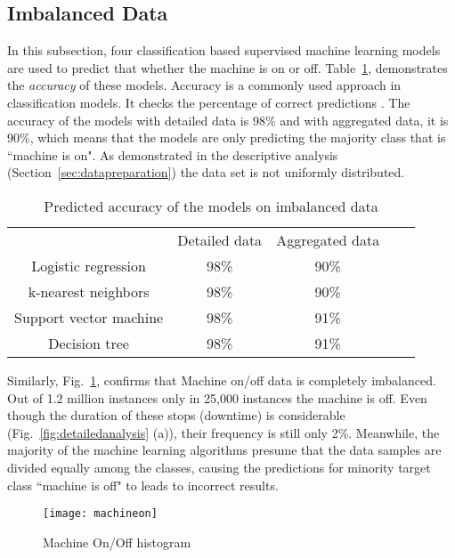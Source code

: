 \documentclass[runningheads]{llncs}
\begin{document}
\subsection {Imbalanced Data}
\label{sec:imbalanced}
In this subsection, four classification based supervised machine learning models are used to predict that whether the machine is on or off. Table~\ref{example3}, demonstrates the \emph{accuracy} of these models. Accuracy is a commonly used approach in classification models. It checks the percentage of correct predictions \cite{book}. The accuracy of the models with detailed data is 98\% and with aggregated data, it is 90\%, which means that the models are only predicting the majority class that is ``machine is on". As demonstrated in the descriptive analysis (Section~\ref{sec:datapreparation}) the data set is not uniformly distributed. 

\begin{table}[ht]
\caption{Predicted accuracy of the models on imbalanced data}
\label{example3}
\centering
\begin{tabular}{ccccc}
\hline\noalign{\smallskip}
 & Detailed data & Aggregated data \\

\noalign{\smallskip}
\hline
\noalign{\smallskip}
Logistic regression     &        98\% &90\%  \\
k-nearest neighbors    &         98\% & 90\% \\
Support vector machine         &        98\% & 91\%   \\
Decision tree &        98\% & 91\%   \\
\hline
\end{tabular}
\end{table}


Similarly, Fig.~\ref{fig:machineon2},  confirms that Machine on/off data is completely imbalanced. Out of 1.2 million instances only in 25,000 instances the machine is off. Even though the duration of these stops (downtime) is considerable (Fig.~\ref{fig:detailedanalysis} (a)), their frequency is still only 2\%. Meanwhile, the majority of the machine learning algorithms presume that the data samples are divided equally among the classes, causing the predictions for minority target class ``machine is off" to leads to incorrect results.

\begin{figure}
\centering
\texttt{[image: machineon]} 
\caption{Machine On/Off histogram}
\label{fig:machineon2}
\end{figure}
\end{document}
